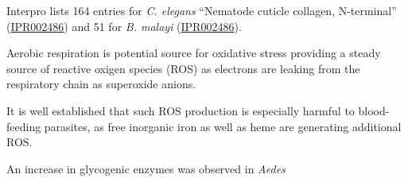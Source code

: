 Interpro lists 164 entries for \textit{C. elegans} ``Nematode cuticle
collagen, N-terminal''
(\href{http://www.ebi.ac.uk/interpro/ISpy?ipr=IPR002486&tax=6239}{IPR002486})
and 51 for \textit{B. malayi}
(\href{http://www.ebi.ac.uk/interpro/ISpy?ipr=IPR002486&tax=6279}{IPR002486}).


Aerobic respiration is potential source for oxidative stress providing
a steady source of reactive oxigen species (ROS) as electrons are
leaking from the respiratory chain as superoxide anions.

It is well established that such ROS production is especially harmful
to blood-feeding parasites, as free inorganic iron as well as heme are
generating additional ROS.

An increase in glycogenic enzymes was observed in \textit{Aedes}


